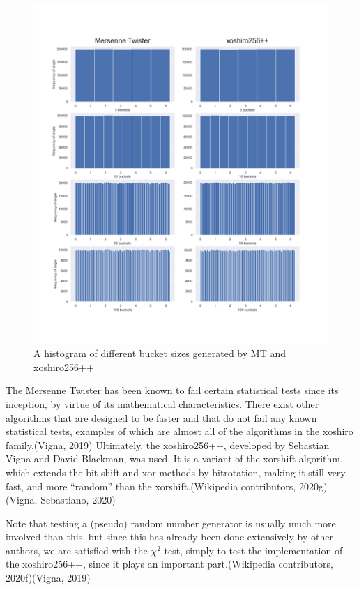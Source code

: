 \documentclass[
]{article}
\begin{document}
\begin{figure}
\centering
\includegraphics{Assets/angle_buckets.png}
\caption{A histogram of different bucket sizes generated by MT and
xoshiro256++}
\end{figure}

The Mersenne Twister has been known to fail certain statistical tests
since its inception, by virtue of its mathematical characteristics.
There exist other algorithms that are designed to be faster and that do
not fail any known statistical tests, examples of which are almost all
of the algorithms in the xoshiro family.(Vigna, 2019) Ultimately, the
xoshiro256++, developed by Sebastian Vigna and David Blackman, was used.
It is a variant of the xorshift algorithm, which extends the bit-shift
and xor methods by bitrotation, making it still very fast, and more
``random'' than the xorshift.(Wikipedia contributors, 2020g)(Vigna,
Sebastiano, 2020)

Note that testing a (pseudo) random number generator is usually much
more involved than this, but since this has already been done
extensively by other authors, we are satisfied with the \(\chi^2\) test,
simply to test the implementation of the xoshiro256++, since it plays an
important part.(Wikipedia contributors, 2020f)(Vigna, 2019)
\end{document}
